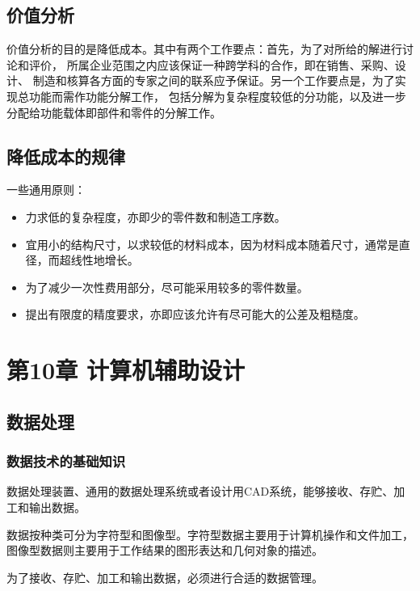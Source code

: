 \documentclass[letterpaper,10pt,english]{sphinxmanual}
\begin{document}
\section{价值分析}
\label{unit9:id10}
价值分析的目的是降低成本。其中有两个工作要点：首先，为了对所给的解进行讨论和评价，
所属企业范围之内应该保证一种跨学科的合作，即在销售、采购、设计、
制造和核算各方面的专家之间的联系应予保证。另一个工作要点是，为了实现总功能而需作功能分解工作，
包括分解为复杂程度较低的分功能，以及进一步分配给功能载体即部件和零件的分解工作。


\section{降低成本的规律}
\label{unit9:id11}
一些通用原则：
\begin{itemize}
\item {} 
力求低的复杂程度，亦即少的零件数和制造工序数。

\item {} 
宜用小的结构尺寸，以求较低的材料成本，因为材料成本随着尺寸，通常是直径，而超线性地增长。

\item {} 
为了减少一次性费用部分，尽可能采用较多的零件数量。

\item {} 
提出有限度的精度要求，亦即应该允许有尽可能大的公差及粗糙度。

\end{itemize}


\chapter{第10章 计算机辅助设计}
\label{unit10::doc}\label{unit10:id1}

\section{数据处理}
\label{unit10:id2}

\subsection{数据技术的基础知识}
\label{unit10:id3}
数据处理装置、通用的数据处理系统或者设计用CAD系统，能够接收、存贮、加工和输出数据。

数据按种类可分为字符型和图像型。字符型数据主要用于计算机操作和文件加工，
图像型数据则主要用于工作结果的图形表达和几何对象的描述。

为了接收、存贮、加工和输出数据，必须进行合适的数据管理。
\end{document}
